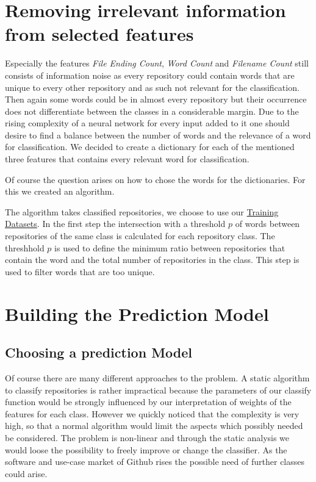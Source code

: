 \documentclass[paper=A4,pagesize=auto,12pt,headinclude=true,footinclude=true,BCOR=0mm,DIV=calc]{scrartcl}
\begin{document}
	
	
	\section{Removing irrelevant information from selected features}
	\label{sec: dictionary}
	Especially the features \textit{File Ending Count}, \textit{Word Count} and\textit{ Filename Count} still consists of information noise as every repository could contain words that are unique to every other repository and as such not relevant for the classification. Then again some words could be in almost every repository but their occurrence does not differentiate between the classes in a considerable margin. Due to the rising complexity of a neural network for every input added to it one should desire to find a balance between the number of words and the relevance of a word for classification. We decided to create a dictionary for each of the mentioned three features that contains every relevant word for classification. 
	
	Of course the question arises on how to chose the words for the dictionaries. For this we created an algorithm.
	
	The algorithm takes classified repositories, we choose to use our \hyperref[sec:Training Set]{Training Datasets}.
	In the first step the intersection with a threshold $p$ of words between repositories of the same class is calculated for each repository class. The threshhold $p$ is used to define the minimum ratio between repositories that contain the word and the total number of repositories in the class. 
	This step is used to filter words that are too unique.
	
	
	\section{Building the Prediction Model}
	
	\subsection{Choosing a prediction Model}
	Of course there are many different approaches to the problem. A static algorithm to classify repositories is rather impractical because the parameters of our classify function would be strongly influenced by our interpretation of weights of the features for each class. However we quickly noticed that the complexity is very high, so that a normal algorithm would limit the aspects which possibly needed be considered. The problem is non-linear and through the static analysis we would loose the possibility to freely improve or change the classifier. As the software and use-case market of Github rises the possible need of further classes could arise.
	
\end{document}
